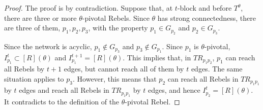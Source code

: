 \documentclass[12pt,letter]{article}
\theoremstyle{definition}
\theoremstyle{remark}
\theoremstyle{claim}
\begin{document}
\begin{proof}
The proof is by contradiction. Suppose that, at $t$-block and before $T^{\theta}$, there are three or more $\theta$-pivotal Rebels. Since $\theta$ has strong connectedness, there are three of them, $p_1,p_2,p_3$, with the property $p_1\in G_{p_2}$ and $p_2 \in G_{p_3}$. 

Since the network is acyclic, $p_1\notin G_{p_3}$ and $p_3\notin G_{p_1}$. Since $p_1$ is $\theta$-pivotal, $I^t_{p_1}\subset [R](\theta)$ and $I^{t+1}_{p_1}=[R](\theta)$. This implies that, in $TR_{p_1p_2}$, $p_1$ can reach all Rebels by $t+1$ edges, but cannot reach all of them by $t$ edges. The same situation applies to $p_3$. However, this means that $p_2$ can reach all Rebels in $TR_{p_1p_1}$ by $t$ edges and reach all Rebels in $TR_{p_1p_1}$ by $t$ edges, and hence $I^t_{p_2}=[R](\theta)$. It contradicts to the definition of the $\theta$-pivotal Rebel.

\end{proof}
\end{document}
